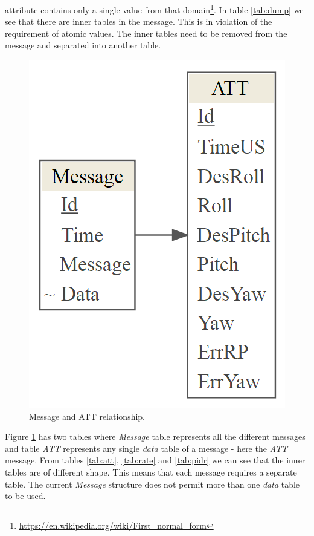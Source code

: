 \documentclass[12pt,oneside]{reedthesis}
\theoremstyle{definition}
\theoremstyle{definition}
\theoremstyle{definition}
\theoremstyle{remark}
\begin{document}
attribute contains only a single value from that domain\footnote{\url{https://en.wikipedia.org/wiki/First_normal_form}}.
In table \ref{tab:dump} we see that there are inner tables in the
message. This is in violation of the requirement of atomic values. The
inner tables need to be removed from the message and separated into
another table.
\begin{figure}
\centering
\includegraphics{./figure/1fn.PNG}
\caption{\label{fig:1fn}Message and ATT relationship.}
\end{figure}
Figure \ref{fig:1fn} has two tables where \emph{Message} table
represents all the different messages and table \emph{ATT} represents
any single \emph{data} table of a message - here the \emph{ATT} message.
From tables \ref{tab:att}, \ref{tab:rate} and \ref{tab:pidr} we can see
that the inner tables are of different shape. This means that each
message requires a separate table. The current \emph{Message} structure
does not permit more than one \emph{data} table to be used.
\end{document}
